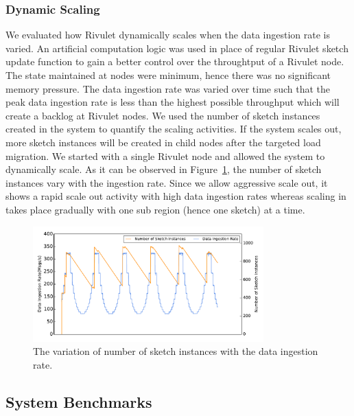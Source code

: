 \subsubsection{Dynamic Scaling}
We evaluated how Rivulet dynamically scales when the data ingestion rate is varied.
An artificial computation logic was used in place of regular Rivulet sketch update function to gain a better control over the throughtput of a Rivulet node.
The state maintained at nodes were minimum, hence there was no significant memory pressure.
The data ingestion rate was varied over time such that the peak data ingestion rate is less than the highest possible throughput which will create a backlog at Rivulet nodes.
We used the number of sketch instances created in the system to quantify the scaling activities.
If the system scales out, more sketch instances will be created in child nodes after the targeted load migration.
We started with a single Rivulet node and allowed the system to dynamically scale.
As it can be observed in Figure~\ref{fig:dyn-scaling}, the number of sketch instances vary with the ingestion rate.
Since we allow aggressive scale out, it shows a rapid scale out activity with high data ingestion rates whereas scaling in takes place gradually with one sub region (hence one sketch) at a time.
\begin{figure}
    \centerline{\includegraphics[width=3.5in]{figures/dyn-scaling.pdf}}
    \caption{The variation of number of sketch instances with the data ingestion rate.}
    \label{fig:dyn-scaling}
\end{figure}

\subsection{System Benchmarks}

